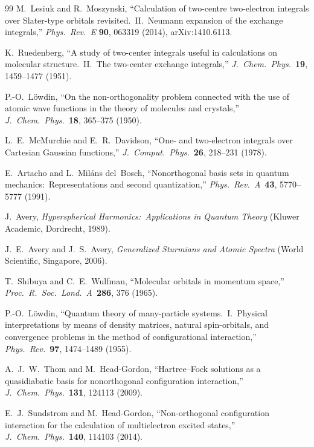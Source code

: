 \documentclass[aps,pra,twocolumn,superscriptaddress,longbibliography]{revtex4-2}
\begin{document}
\begin{thebibliography}{99}
M.~Lesiuk and R.~Moszynski, ``Calculation of two-centre two-electron integrals
over Slater-type orbitals revisited.\ II.\ Neumann expansion of the exchange
integrals,'' \textit{Phys.\ Rev.\ E} \textbf{90}, 063319 (2014), arXiv:1410.6113.

K.~Ruedenberg, ``A study of two-center integrals useful in calculations
on molecular structure.\ II.\ The two-center exchange integrals,''
\textit{J.\ Chem.\ Phys.}\ \textbf{19}, 1459--1477 (1951).

P.-O.~L\"owdin, ``On the non-orthogonality problem connected with the use
of atomic wave functions in the theory of molecules and crystals,''
\textit{J.\ Chem.\ Phys.}\ \textbf{18}, 365--375 (1950).

L.~E.~McMurchie and E.~R.~Davidson, ``One- and two-electron integrals
over Cartesian Gaussian functions,''
\textit{J.\ Comput.\ Phys.}\ \textbf{26}, 218--231 (1978).

E.~Artacho and L.~Mil\'ans del~Bosch, ``Nonorthogonal basis sets in
quantum mechanics:\ Representations and second quantization,''
\textit{Phys.\ Rev.\ A}\ \textbf{43}, 5770--5777 (1991).

J.~Avery, \textit{Hyperspherical Harmonics:\ Applications in Quantum
Theory} (Kluwer Academic, Dordrecht, 1989).

J.~E.~Avery and J.~S.~Avery, \textit{Generalized Sturmians and Atomic
Spectra} (World Scientific, Singapore, 2006).

T.~Shibuya and C.~E.~Wulfman, ``Molecular orbitals in momentum space,''
\textit{Proc.\ R.\ Soc.\ Lond.\ A}\ \textbf{286}, 376 (1965).

P.-O.~L\"owdin, ``Quantum theory of many-particle systems.\ I.\ Physical
interpretations by means of density matrices, natural spin-orbitals, and
convergence problems in the method of configurational interaction,''
\textit{Phys.\ Rev.}\ \textbf{97}, 1474--1489 (1955).

A.~J.~W.~Thom and M.~Head-Gordon, ``Hartree--Fock solutions as a
quasidiabatic basis for nonorthogonal configuration interaction,''
\textit{J.\ Chem.\ Phys.}\ \textbf{131}, 124113 (2009).

E.~J.~Sundstrom and M.~Head-Gordon, ``Non-orthogonal configuration
interaction for the calculation of multielectron excited states,''
\textit{J.\ Chem.\ Phys.}\ \textbf{140}, 114103 (2014).


\end{thebibliography}
\end{document}
